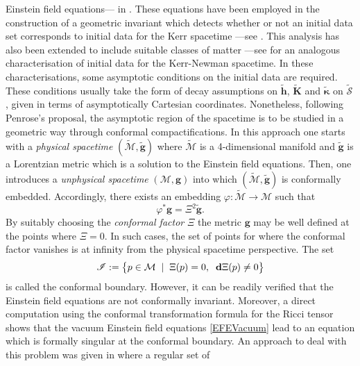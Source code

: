 \documentclass[10pt,a4paper]{article}
\theoremstyle{plain}
\def\bmg{{\bm g}}
\def\bmh{{\bm h}}
\def\bmK{{\bm K}}
\begin{document}
 Einstein field equations--- in \cite{GarVal08c}.  These equations
 have been employed in the construction of a geometric invariant which
 detects whether or not an initial data set corresponds to initial
 data for the Kerr spacetime ---see
 \cite{BaeVal10a,BaeVal10b,BaeVal11b}.  This analysis has also been
 extended to include suitable classes of matter ---see \cite{ValCol16}
 for an analogous characterisation of initial data for the Kerr-Newman
 spacetime.  In these characterisations, some asymptotic conditions on
 the initial data are required. These conditions usually take the form
 of decay assumptions on $\tilde{\bmh}$, $\tilde{\bmK}$ and
 $\tilde{\bm\kappa}$ on $\tilde{\mathcal{S}}$, given in terms of
 asymptotically Cartesian coordinates.  Nonetheless, following
 Penrose's proposal, the asymptotic region of the spacetime is to be
 studied in a geometric way through conformal compactifications.  In
 this approach one starts with a \emph{physical spacetime}
 $(\tilde{\mathcal{M}},\tilde{\bmg})$ where $\tilde{\mathcal{M}}$ is a
 4-dimensional manifold and $\tilde{\bmg}$ is a Lorentzian metric
 which is a solution to the Einstein field equations.  Then, one
 introduces a \emph{unphysical spacetime} $(\mathcal{M},\bmg)$ into
 which $(\tilde{\mathcal{M}},\tilde{\bmg})$ is conformally embedded.
Accordingly, there exists an embedding $\varphi: \tilde{\mathcal{M}}
\rightarrow \mathcal{M}$ such that
\begin{equation} \label{eqn:Chapter:Introduction:ConformalRescaling}
\varphi^{*}\bmg=\Xi^2\tilde{\bmg}.
\end{equation}
 By suitably choosing the \emph{conformal factor} $\Xi$ the metric
 $\bmg$ may be well defined at the points where $\Xi=0$. In such
 cases, the set of points for where the conformal factor vanishes is
 at infinity from the physical spacetime perspective.
\noindent The set
\[
 \mathscr{I} := \big\{p \in \mathcal{M} \hspace{0.2cm}| \hspace{0.2cm} \Xi(p)=0
 , \hspace{0.2cm} \mathbf{d}\Xi(p) \neq0\big\}
\]
is called the conformal boundary.  However, it can be readily
verified that the Einstein field equations are not conformally
invariant. Moreover, a direct computation using the conformal
transformation formula for the Ricci tensor shows that the vacuum
Einstein field equations \eqref{EFEVacuum} lead to an equation which
is formally singular at the conformal boundary.  An approach to deal
with this problem was given in \cite{Fri81a} where a regular set of
\end{document}
